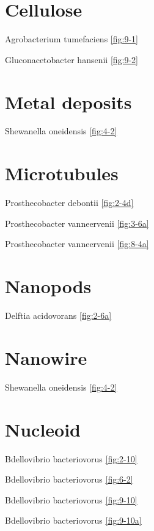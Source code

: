 \documentclass[]{tufte-book}
\begin{document}
\section{\texorpdfstring{\textbf{Cellulose}}{Cellulose}}\label{cellulose-1}

Agrobacterium tumefaciens \ref{fig:9-1}

Gluconacetobacter hansenii \ref{fig:9-2}

\section{\texorpdfstring{\textbf{Metal
deposits}}{Metal deposits}}\label{metal-deposits}

Shewanella oneidensis \ref{fig:4-2}

\section{\texorpdfstring{\textbf{Microtubules}}{Microtubules}}\label{microtubules}

Prosthecobacter debontii \ref{fig:2-4d}

Prosthecobacter vanneervenii \ref{fig:3-6a}

Prosthecobacter vanneervenii \ref{fig:8-4a}

\section{\texorpdfstring{\textbf{Nanopods}}{Nanopods}}\label{nanopods}

Delftia acidovorans \ref{fig:2-6a}

\section{\texorpdfstring{\textbf{Nanowire}}{Nanowire}}\label{nanowire}

Shewanella oneidensis \ref{fig:4-2}

\section{\texorpdfstring{\textbf{Nucleoid}}{Nucleoid}}\label{nucleoid}

Bdellovibrio bacteriovorus \ref{fig:2-10}

Bdellovibrio bacteriovorus \ref{fig:6-2}

Bdellovibrio bacteriovorus \ref{fig:9-10}

Bdellovibrio bacteriovorus \ref{fig:9-10a}
\end{document}
